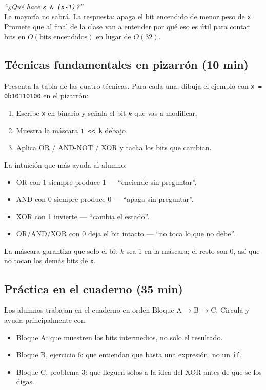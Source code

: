 \documentclass[12pt, oneside]{article}
\begin{document}
\begin{notaprofesor}
  \textit{``¿Qué hace \texttt{x \& (x-1)}?''}\\[4pt]
  La mayoría no sabrá. La respuesta: apaga el bit encendido de menor peso
  de \texttt{x}. Promete que al final de la clase van a entender por qué
  eso es útil para contar bits en $O(\text{bits encendidos})$ en lugar de
  $O(32)$.
\end{notaprofesor}

\subsection{Técnicas fundamentales en pizarrón (10 min)}

Presenta la tabla de las cuatro técnicas. Para cada una, dibuja el ejemplo
con \texttt{x = 0b10110100} en el pizarrón:

\begin{enumerate}
  \item Escribe \texttt{x} en binario y señala el bit $k$ que vas a modificar.
  \item Muestra la máscara \texttt{1 << k} debajo.
  \item Aplica OR / AND-NOT / XOR y tacha los bits que cambian.
\end{enumerate}

\begin{notaprofesor}
  La intuición que más ayuda al alumno:
  \begin{itemize}
    \item OR con 1 siempre produce 1 — ``enciende sin preguntar''.
    \item AND con 0 siempre produce 0 — ``apaga sin preguntar''.
    \item XOR con 1 invierte — ``cambia el estado''.
    \item OR/AND/XOR con 0 deja el bit intacto — ``no toca lo que no debe''.
  \end{itemize}
  La máscara  garantiza que solo el bit $k$ sea 1 en la
  máscara; el resto son 0, así que no tocan los demás bits de \texttt{x}.
\end{notaprofesor}

\subsection{Práctica en el cuaderno (35 min)}

Los alumnos trabajan en el cuaderno en orden Bloque A → B → C.
Circula y ayuda principalmente con:
\begin{itemize}
  \item Bloque A: que muestren los bits intermedios, no solo el resultado.
  \item Bloque B, ejercicio 6: que entiendan que basta una expresión, no un
        \texttt{if}.
  \item Bloque C, problema 3: que lleguen solos a la idea del XOR antes de
        que se los digas.
\end{itemize}
\end{document}
